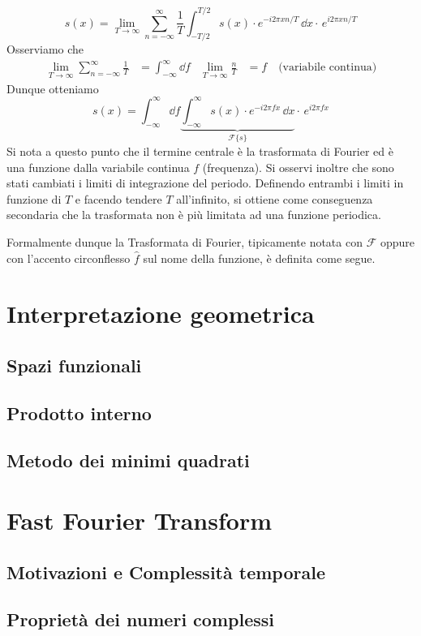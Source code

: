 \[
    s(x) = \lim_{T\to\infty} \sum_{n=-\infty}^\infty
        \frac{1}{T}\int_{-T/2}^{T/2} s(x)\cdot e^{-i2\pi xn/T}\,\dd{x}
        \cdot\,e^{i2\pi xn/T}
\]
Osserviamo che
\begin{align*}
    \lim_{T\to\infty} \sum_{n=-\infty}^\infty \frac{1}{T} &= \int_{-\infty}^\infty \dd{f} &
    \lim_{T\to\infty} \frac{n}{T} &= f \quad \text{(variabile continua)}
\end{align*}
Dunque otteniamo
\[
    s(x) = \int_{-\infty}^\infty \dd{f} 
           \underbrace{
               \int_{-\infty}^\infty s(x)\cdot e^{-i2\pi fx}\,\dd{x}
           }_{\mathcal{F}\{s\}}
           \cdot\,e^{i2\pi fx}
\]
Si nota a questo punto che il termine centrale \`e la trasformata di Fourier
ed \`e una funzione dalla variabile continua \(f\) (frequenza).
Si osservi inoltre che sono stati cambiati i limiti di integrazione del
periodo.  Definendo entrambi i limiti in funzione di \(T\) e facendo tendere
\(T\) all'infinito, si ottiene come conseguenza secondaria che la trasformata
non \`e pi\`u limitata ad una funzione periodica.

Formalmente dunque la Trasformata di Fourier, tipicamente notata con
\(\mathcal{F}\) oppure con l'accento circonflesso \(\hat{f}\) sul nome della
funzione, \`e definita come segue.

\noindent\fbox{\begin{minipage}{\textwidth}\[
    \mathcal{F}\{f\} = \hat{f}\,(\omega) 
    = \int_{-\infty}^\infty f(x)\cdot e^{-i\omega x}\,\dd{x}
\]\end{minipage}}

\section{Interpretazione geometrica}
\subsection{Spazi funzionali}
\subsection{Prodotto interno}
\subsection{Metodo dei minimi quadrati}


\section{Fast Fourier Transform}
\subsection{Motivazioni e Complessit\`a temporale}
\subsection{Propriet\`a dei numeri complessi}

